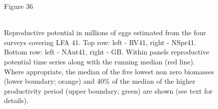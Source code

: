 \documentclass[11pt]{article}
\newcommand{\e}{/SpinDr/backup/bio_data/bio.lobster/figures/} %
\begin{document}
\begin{landscape}
\begin{figure}

\centering
   
       {Figure 36}\\
       \\

    
\caption{Reproductive potential in millions of eggs estimated from the four surveys covering LFA 41. Top row: left - RV41, right - NSpr41. Bottom row: left - NAut41, right - GB. Within panels reproductive potential time series along with the running median (red line). Where appropriate, the median of the five lowest non zero biomasses (lower boundary; orange) and  40\% of the median of the higher productivity period (upper boundary; green) are shown (see text for details). }
\end{figure}
\end{landscape}
\end{document}
